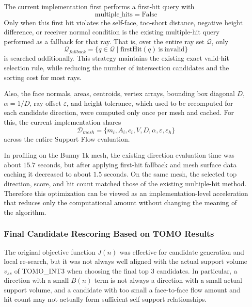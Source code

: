 \documentclass[11pt,a4paper]{article}
\begin{document}
The current implementation first performs a first-hit query with
\begin{equation}
\mathrm{multiple\_hits}=\mathrm{False}
\end{equation}
Only when this first hit violates the self-face, too-short distance, negative height difference, or receiver normal condition
is the existing multiple-hit query performed as a fallback for that ray.
That is, over the entire ray set $\mathcal{Q}$, only
\begin{equation}
\mathcal{Q}_{fallback}
=
\{q\in\mathcal{Q}\mid \mathrm{firstHit}(q)\ \mathrm{is\ invalid}\}
\end{equation}
is searched additionally.
This strategy maintains the existing exact valid-hit selection rule, while
reducing the number of intersection candidates and the sorting cost for most rays.

Also, the face normals, areas, centroids, vertex arrays,
bounding box diagonal $D$, $\alpha=1/D$, ray offset $\varepsilon$, and height tolerance, which used to be recomputed for each candidate direction,
were computed only once per mesh and cached.
For this, the current implementation shares
\begin{equation}
\mathcal{D}_{mesh}
=
\{m_i,A_i,c_i,V,D,\alpha,\varepsilon,\varepsilon_h\}
\end{equation}
across the entire Support Flow evaluation.

In profiling on the Bunny 1k mesh,
the existing direction evaluation time was about $15.7$ seconds, but
after applying first-hit fallback and mesh surface data caching it decreased to about $1.5$ seconds.
On the same mesh, the selected top direction, score, and hit count matched those of the existing multiple-hit method.
Therefore this optimization can be viewed as an implementation-level acceleration that reduces only the computational amount without changing the meaning of the algorithm.

\subsubsection{Final Candidate Rescoring Based on TOMO Results}

The original objective function $J(n)$ was effective for candidate generation and local re-search, but
it was not always well aligned with the actual support volume $v_{ss}$ of TOMO\_INT3 when choosing the final top 3 candidates.
In particular, a direction with a small $B(n)$ term is not always a direction with a small actual support volume,
and a candidate with too small a face-to-face flow amount and hit count may not actually form sufficient self-support relationships.
\end{document}
